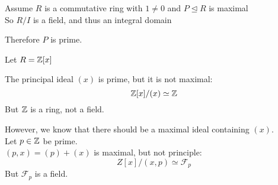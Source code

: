 \documentclass[letterpaper,12pt,fleqn]{article}
\newcommand{\ide}{\trianglelefteq}
\begin{document}
\begin{theproof}
  Assume $R$ is a commutative ring with $1\ne0$ and $P\ide R$ is maximal \\
  So $R/I$ is a field, and thus an integral domain

  Therefore $P$ is prime.
\end{theproof}

\begin{example}
  Let $R=\mathbb{Z}[x]$

  The principal ideal $(x)$ is prime, but it is not maximal:
  \[\mathbb{Z}[x]/(x)\simeq\mathbb{Z}\]
  But $\mathbb{Z}$ is a ring, not a field.

  However, we know that there should be a maximal ideal containing $(x)$. \\
  Let $p\in\mathbb{Z}$ be prime. \\
  $(p,x)=(p)+(x)$ is maximal, but not principle:
  \[Z[x]/(x,p)\simeq\mathcal{F}_p\]
  But $\mathcal{F}_p$ is a field.
\end{example}
\end{document}
